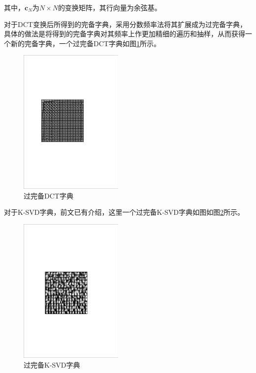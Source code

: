 \documentclass[11pt]{article}
\begin{document}
\par
其中，$\mathbf{c}_N$为$N \times N$的变换矩阵，其行向量为余弦基。
\par
对于DCT变换后所得到的完备字典，采用分数频率法将其扩展成为过完备字典，具体的做法是将得到的完备字典对其频率上作更加精细的遍历和抽样，从而获得一个新的完备字典，一个过完备DCT字典如图\ref{Fig_DCT}所示。
\begin{figure}[htbp]
\centering
\includegraphics[width=2in]{./FigureFolder/Foundation/KSVD/DCT.pdf}
\caption{过完备DCT字典}
\label{Fig_DCT}
\end{figure}
\par
对于K-SVD字典，前文已有介绍，这里一个过完备K-SVD字典如图如图\ref{Fig_KSVD}所示。
\begin{figure}[htbp]
\centering
\includegraphics[width=2in]{./FigureFolder/Foundation/KSVD/KSVD.pdf}
\caption{过完备K-SVD字典}
\label{Fig_KSVD}
\end{figure}
\par
\end{document}
